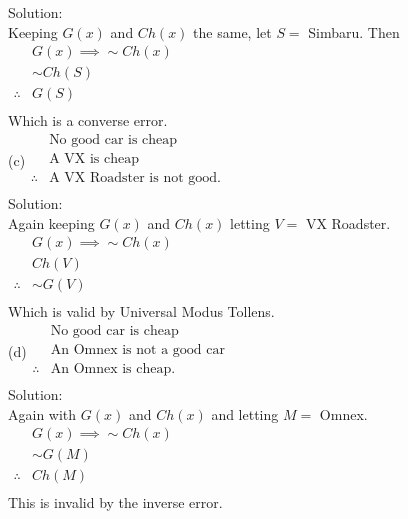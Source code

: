 \documentclass[10 pt]{amsart}
\theoremstyle{definition}
\theoremstyle{remark}
\numberwithin{equation}{subsection}
\begin{document}
Solution:\\
Keeping $G(x)$ and $Ch(x)$ the same, let $S = $ Simbaru.  Then\\


$\begin{array}{rl}
& G(x) \implies \sim Ch(x)\\
& \sim Ch(S)\\
\therefore & G(S)\\
\end{array}$\\
Which is a converse error.\\

(c)$\begin{array}{rl}
&\text{No good car is cheap}\\
&\text{A VX is cheap}\\
\therefore & \text{A VX Roadster is not good.}\\
\end{array}$\\

Solution:\\
Again keeping $G(x)$ and $Ch(x)$ letting $V = $ VX Roadster.\\

$\begin{array}{rl}
& G(x) \implies \sim Ch(x)\\
& Ch(V)\\
\therefore & \sim G(V)\\
\end{array}$\\

Which is valid by Universal Modus Tollens.\\


(d)$\begin{array}{rl}
&\text{No good car is cheap}\\
&\text{An Omnex is not a good car}\\
\therefore & \text{An Omnex is cheap.}\\
\end{array}$\\

Solution:\\
Again with $G(x)$ and $Ch(x)$ and letting $M = $ Omnex.\\


$\begin{array}{rl}
& G(x) \implies \sim Ch(x)\\
& \sim G(M)\\
\therefore &  Ch(M)\\
\end{array}$\\
This is invalid by the inverse error.\\
\end{document}
